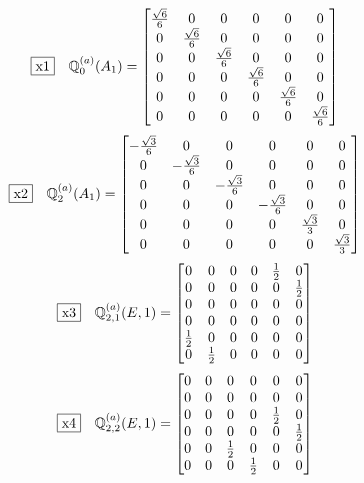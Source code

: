 \documentclass[fleqn,10pt,landscape]{jsarticle}
\begin{document}
\begin{dmath*}
\fbox{x1}\quad \mathbb{Q}_{0}^{(a)}(A_{1})=\begin{bmatrix} \frac{\sqrt{6}}{6} & 0 & 0 & 0 & 0 & 0 \\ 0 & \frac{\sqrt{6}}{6} & 0 & 0 & 0 & 0 \\ 0 & 0 & \frac{\sqrt{6}}{6} & 0 & 0 & 0 \\ 0 & 0 & 0 & \frac{\sqrt{6}}{6} & 0 & 0 \\ 0 & 0 & 0 & 0 & \frac{\sqrt{6}}{6} & 0 \\ 0 & 0 & 0 & 0 & 0 & \frac{\sqrt{6}}{6} \end{bmatrix}
\end{dmath*}
\begin{dmath*}
\fbox{x2}\quad \mathbb{Q}_{2}^{(a)}(A_{1})=\begin{bmatrix} - \frac{\sqrt{3}}{6} & 0 & 0 & 0 & 0 & 0 \\ 0 & - \frac{\sqrt{3}}{6} & 0 & 0 & 0 & 0 \\ 0 & 0 & - \frac{\sqrt{3}}{6} & 0 & 0 & 0 \\ 0 & 0 & 0 & - \frac{\sqrt{3}}{6} & 0 & 0 \\ 0 & 0 & 0 & 0 & \frac{\sqrt{3}}{3} & 0 \\ 0 & 0 & 0 & 0 & 0 & \frac{\sqrt{3}}{3} \end{bmatrix}
\end{dmath*}
\begin{dmath*}
\fbox{x3}\quad \mathbb{Q}_{2,1}^{(a)}(E,1)=\begin{bmatrix} 0 & 0 & 0 & 0 & \frac{1}{2} & 0 \\ 0 & 0 & 0 & 0 & 0 & \frac{1}{2} \\ 0 & 0 & 0 & 0 & 0 & 0 \\ 0 & 0 & 0 & 0 & 0 & 0 \\ \frac{1}{2} & 0 & 0 & 0 & 0 & 0 \\ 0 & \frac{1}{2} & 0 & 0 & 0 & 0 \end{bmatrix}
\end{dmath*}
\begin{dmath*}
\fbox{x4}\quad \mathbb{Q}_{2,2}^{(a)}(E,1)=\begin{bmatrix} 0 & 0 & 0 & 0 & 0 & 0 \\ 0 & 0 & 0 & 0 & 0 & 0 \\ 0 & 0 & 0 & 0 & \frac{1}{2} & 0 \\ 0 & 0 & 0 & 0 & 0 & \frac{1}{2} \\ 0 & 0 & \frac{1}{2} & 0 & 0 & 0 \\ 0 & 0 & 0 & \frac{1}{2} & 0 & 0 \end{bmatrix}
\end{dmath*}
\end{document}
